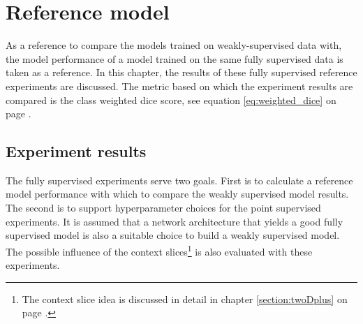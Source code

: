 \chapter{Reference model\label{sec:reference_model}}\thispagestyle{empty}
\par{
    As a reference to compare the models trained on weakly-supervised data with, the model performance of a model trained on the same fully supervised data is taken as a reference.
    In this chapter, the results of these fully supervised reference experiments are discussed.
    The metric based on which the experiment results are compared is the class weighted dice score, see equation \ref{eq:weighted_dice} on page \pageref{eq:weighted_dice}.
}

\section{Experiment results}
\par{
    The fully supervised experiments serve two goals.
    First is to calculate a reference model performance with which to compare the weakly supervised model results.
    The second is to support hyperparameter choices for the point supervised experiments.
    It is assumed that a network architecture that yields a good fully supervised model is also a suitable choice to build a weakly supervised model.
    The possible influence of the context slices\footnote{The context slice idea is discussed in detail in chapter \ref{section:twoDplus} on page \pageref{section:twoDplus}.} is also evaluated with these experiments.
}
